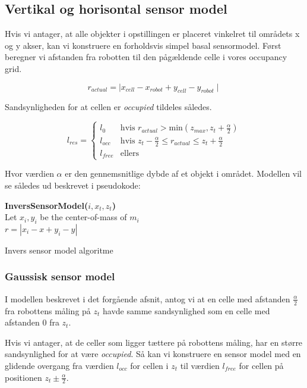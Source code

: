 \subsection{Vertikal og horisontal sensor model}
Hvis vi antager, at alle objekter i opstillingen er placeret vinkelret til områdets x og y akser,
kan vi konstruere en forholdsvis simpel basal sensormodel.
Først beregner vi afstanden fra robotten til den pågældende celle i vores occupancy grid.

$$r_{actual} = \mid x_{cell} - x_{robot} + y_{cell} - y_{robot} \mid$$

Sandsynligheden for at cellen er  \emph{occupied} tildeles således.

$$l_{res} = \begin{cases} 
	l_0 &\text{hvis }r_{actual} > \text{min}(z_{max},z_t+\frac{\alpha}{2}) \\ 
	l_{occ} &\text{hvis } z_t-\frac{\alpha}{2} \leq r_{actual} \leq z_t+\frac{\alpha}{2}\\ 
	l_{free} &\text{ellers}  
\end{cases}$$

Hvor værdien $\alpha$ er den gennemsnitlige dybde af et objekt i området.
Modellen vil se således ud beskrevet i pseudokode:

\begin{algorithm}[H]
\textbf{InversSensorModel($i, x_t, z_t$)} \\
Let $x_i,y_i$ be the center-of-mass of $m_i$ \\
$r = |x_i - x + y_i - y|$ \\
\caption{Invers sensor model algoritme}
\label{alg:inversesensormodel}
\end{algorithm}

\subsubsection{Gaussisk sensor model}

I modellen beskrevet i det forgående afsnit, antog vi at en celle
med afstanden $\frac{\alpha}{2}$ fra robottens måling på $z_t$ havde
samme sandsynlighed som en celle med afstanden 0 fra $z_t$.

Hvis vi antager, at de celler som ligger tættere på robottens måling,
har en større sandsynlighed for at være \emph{occupied}. 
Så kan vi konstruere en sensor model med en glidende overgang fra værdien $l_{occ}$ for 
cellen i $z_t$ til værdien $l_{free}$ for cellen på positionen $z_t \pm \frac{\alpha}{2}$. 

